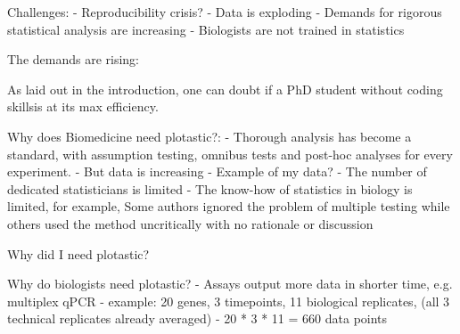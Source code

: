 





\newpage




Challenges:
- Reproducibility crisis?
- Data is exploding
- Demands for rigorous statistical analysis are increasing
- Biologists are not trained in statistics


The demands are rising: \cite{moreno-indiasStatisticalMachineLearning2021}



As laid out in the introduction, one can doubt if a PhD student without coding
skillsis at its max efficiency.

Why does Biomedicine need plotastic?:
- Thorough analysis has become a standard, with assumption testing, omnibus
tests and post-hoc analyses for every experiment.
- But data is increasing
- Example of my data?
- The number of dedicated statisticians is limited
- The know-how of statistics in biology is limited, for example, Some authors
ignored the problem of multiple testing while others used the method
uncritically with no rationale or discussion \cite{pernegerWhatWrongBonferroni1998,armstrongWhenUseBonferroni2014}


Why did I need plotastic?

Why do biologists need plotastic?
- Assays output more data in shorter time, e.g. multiplex qPCR
- example: 20 genes, 3 timepoints, 11 biological replicates, (all 3
technical replicates already averaged)
- 20 * 3 * 11 = 660 data points

